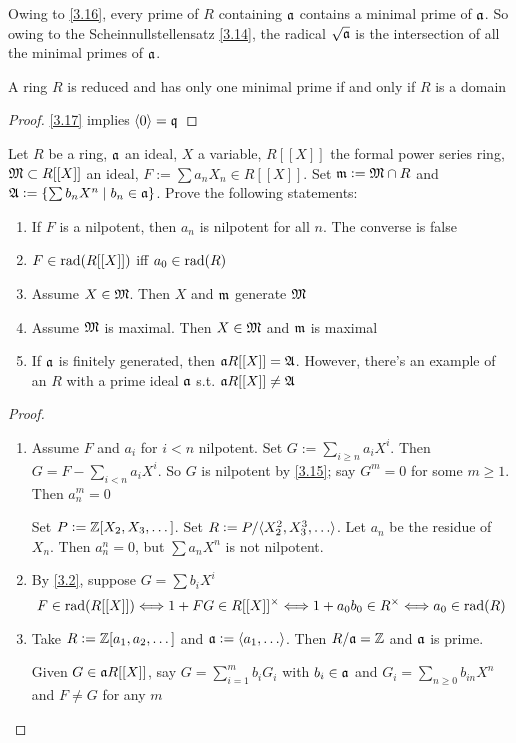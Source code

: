 \documentclass[11pt]{article}
\begin{document}
Owing to \ref{3.16}, every prime of \(R\) containing \(\mathfrak{a}\) contains a minimal
prime of \(\mathfrak{a}\). So owing to the Scheinnullstellensatz \ref{3.14}, the radical
\(\sqrt{\mathfrak{a}}\) is the intersection of all the minimal primes of \(\mathfrak{a}\).

\begin{proposition}[]
A ring \(R\) is reduced and has only one minimal prime if and only if \(R\)
is a domain
\end{proposition}

\begin{proof}
\ref{3.17} implies \(\langle0\rangle=\mathfrak{q}\)
\end{proof}

\begin{exercise}
\label{3.19}
Let \(R\) be a ring, \(\mathfrak{a}\) an ideal, \(X\) a variable, \(R[[X]]\) the formal
power series ring, \(\mathfrak{M}\subset R[[X]]\) an ideal, \(F:=\sum a_nX_n\in R[[X]]\). Set
\(\mathfrak{m}:=\mathfrak{M}\cap R\) and \(\mathfrak{A}:=\{\sum b_nX^n\mid b_n\in\mathfrak{a}\}\). Prove the
following statements:
\begin{enumerate}
\item If \(F\) is a nilpotent, then \(a_n\) is nilpotent for all \(n\). The
converse is false
\item \(F\in\operatorname{rad}(R[[X]])\) iff \(a_0\in\operatorname{rad}(R)\)
\item Assume \(X\in\mathfrak{M}\). Then \(X\) and \(\mathfrak{m}\) generate \(\mathfrak{M}\)
\item Assume \(\mathfrak{M}\) is maximal. Then \(X\in\mathfrak{M}\) and \(\mathfrak{m}\) is maximal
\item If \(\mathfrak{a}\) is finitely generated, then \(\mathfrak{a} R[[X]]=\mathfrak{A}\). However, there's an
example of an \(R\) with a prime ideal \(\mathfrak{a}\) s.t. \(\mathfrak{a} R[[X]]\neq\mathfrak{A}\)
\end{enumerate}
\end{exercise}

\begin{proof}
\begin{enumerate}
\item Assume \(F\) and \(a_i\) for \(i<n\) nilpotent. Set \(G:=\sum_{i\ge
      n}a_iX^i\). Then \(G=F-\sum_{i<n}a_iX^i\). So \(G\) is nilpotent by
\ref{3.15}; say \(G^m=0\) for some \(m\ge1\). Then \(a^m_n=0\)

Set \(P:=\mathbb{Z}[X_2,X_3,\dots]\). Set \(R:=P/\la X_2^2,X_3^3,\dots\ra\). Let
\(a_n\) be the residue of \(X_n\). Then \(a^n_n=0\), but \(\sum a_nX^n\)
is not nilpotent.

\item By \ref{3.2}, suppose \(G=\sum b_iX^i\)
\begin{equation*}
F\in\operatorname{rad}(R[[X]])\Longleftrightarrow 1+FG\in R[[X]]^\times
\Longleftrightarrow 1+a_0b_0\in R^\times\Longleftrightarrow
a_0\in\operatorname{rad}(R)
\end{equation*}

\setcounter{enumi}{4}
\item Take \(R:=\mathbb{Z}[a_1,a_2,\dots]\) and \(\fa:=\la a_1,\dots\ra\). Then
\(R/\mathfrak{a}=\mathbb{Z}\) and \(\mathfrak{a}\) is prime.

Given \(G\in\mathfrak{a} R[[X]]\), say \(G=\sum_{i=1}^mb_iG_i\) with \(b_i\in\mathfrak{a}\) and
\(G_i=\sum_{n\ge0}b_{in}X^n\) and \(F\neq G\) for any \(m\)
\end{enumerate}
\end{proof}
\end{document}
